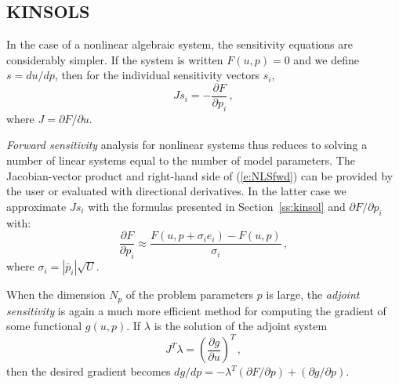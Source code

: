 
\subsection{KINSOLS}

In the case of a nonlinear algebraic system, the sensitivity
equations are considerably simpler.  If the system is written
$F(u,p) = 0$ and we define $s = d u / d p$, then for the
individual sensitivity vectors $s_i$,
\begin{equation}\label{e:NLSfwd}
  J s_i = -\frac{\partial F}{\partial p_i} \, ,
\end{equation}
where $ J = \partial F / \partial u$.

{\em Forward sensitivity} analysis for nonlinear systems thus reduces to solving a
number of linear systems equal to the number of model parameters.
The Jacobian-vector product and right-hand side of (\ref{e:NLSfwd}) can be provided
by the user or evaluated with directional derivatives. In the latter case
we approximate $J s_i$ with the formulas presented in Section~\ref{ss:kinsol}
and ${\partial F}/{\partial p_i}$ with:
\begin{equation*}
\frac{\partial F}{\partial p_i} \approx \frac{F(u,p + \sigma_i e_i)-
    F(u,p)}{\sigma_i} \, ,
\end{equation*}
where $\sigma_i = |{\bar p}_i| \sqrt{U}$.

When the dimension $N_p$ of the problem parameters $p$ is large, the
{\em adjoint sensitivity} is again a much more efficient method for computing
the gradient of some functional $g(u,p)$. If $\lambda$ is the solution of
the adjoint system
\begin{equation*}
  J^T \lambda = \left( \frac{\partial g}{\partial u} \right)^T \, ,
\end{equation*}
then the desired gradient becomes
${dg}/{dp} = -\lambda^T ({\partial F}/{\partial p}) + ({\partial g}/{\partial p})$.
